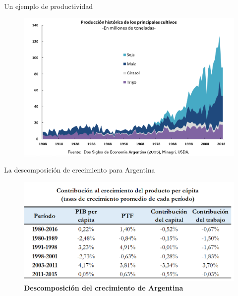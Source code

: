\documentclass{beamer}
\begin{document}
\begin{frame}{Un ejemplo de productividad}
    \begin{figure} [H]   \includegraphics[scale=0.55]{Figures/C17.3.png}
\label{fig:17.3}
\end{figure}
\end{frame}


\begin{frame}{La descomposición de crecimiento para Argentina}
    \begin{figure} [H]   \includegraphics[scale=0.55]{Figures/C17.4.png}
\caption{\textbf{Descomposición del crecimiento de Argentina}}
\label{fig:26.4}
\end{figure}
\end{frame}
\end{document}
